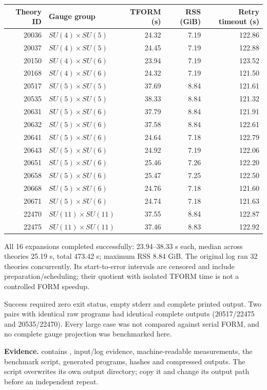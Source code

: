 {\small
\begin{center}
\begin{tabular}{rlrrr}
\toprule Theory ID & Gauge group & TFORM (s) & RSS (GiB) & Retry timeout (s)\\\midrule
20036 & $SU(4)\times SU(5)$ & 24.32 & 7.19 & 122.86\\
20037 & $SU(4)\times SU(5)$ & 24.45 & 7.19 & 122.88\\
20150 & $SU(4)\times SU(6)$ & 23.94 & 7.19 & 123.52\\
20168 & $SU(4)\times SU(6)$ & 24.32 & 7.19 & 121.50\\
20517 & $SU(5)\times SU(5)$ & 37.69 & 8.84 & 121.61\\
20535 & $SU(5)\times SU(5)$ & 38.33 & 8.84 & 121.32\\
20631 & $SU(5)\times SU(6)$ & 37.79 & 8.84 & 121.91\\
20632 & $SU(5)\times SU(6)$ & 37.58 & 8.84 & 122.61\\
20641 & $SU(5)\times SU(6)$ & 24.64 & 7.18 & 122.79\\
20643 & $SU(5)\times SU(6)$ & 24.92 & 7.19 & 122.06\\
20651 & $SU(5)\times SU(6)$ & 25.46 & 7.26 & 122.20\\
20658 & $SU(5)\times SU(6)$ & 25.47 & 7.25 & 122.50\\
20668 & $SU(5)\times SU(6)$ & 24.76 & 7.18 & 121.60\\
20671 & $SU(5)\times SU(6)$ & 24.74 & 7.18 & 121.63\\
22470 & $SU(11)\times SU(11)$ & 37.55 & 8.84 & 122.87\\
22475 & $SU(11)\times SU(11)$ & 37.46 & 8.83 & 122.92\\
\bottomrule
\end{tabular}
\end{center}}
All 16 expansions completed successfully: 23.94--38.33 s each, median across
theories 25.19 s, total 473.42 s; maximum RSS 8.84 GiB. The original log ran
32 theories concurrently. Its start-to-error intervals are censored and
include preparation/scheduling; their quotient with isolated TFORM time is
not a controlled FORM speedup.

Success required zero exit status, empty stderr and complete printed output.
Two pairs with identical raw programs had identical complete outputs
(20517/22475 and 20535/22470). Every large case was not compared against
serial FORM, and no complete gauge projection was benchmarked here.

\textbf{Evidence.}
contains , input/log evidence, machine-readable measurements,
the benchmark script, generated programs, hashes and compressed outputs.
The script overwrites its own output directory; copy it and change its output
path before an independent repeat.

